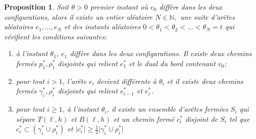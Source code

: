 \documentclass[titlepage,a4paper,12pt]{article}
\newcounter{prop}
\newtheorem{chaine}[prop]{Proposition}
\begin{document}
\begin{chaine}
\label{chaine}
Soit $\theta>0$ premier instant où $e_0$ diffère dans les deux configurations, alors il existe un entier aléatoire $N\in \mathbb{N},$ une suite d'arêtes aléatoires $e_1,\dots,e_N$ et des instants aléatoires $0<\theta_1< \theta_2<\dots<\theta_N=t$ qui vérifient les conditions suivantes:

\begin{enumerate}[leftmargin =*]
\item à l'instant $\theta_1$, $e_1$ diffère dans les deux configurations. Il existe deux chemins fermés $p_1^*,\rho_1^*$ disjoints qui relient $e_1^*$ et le dual du bord contenant $v_0$;

\item pour tout $i>1$, l'arête $e_i$ devient différente à $\theta_i$ et il existe deux chemins fermés $\gamma_i^*,\rho_i^*$ disjoints qui relient $e_{i-1}^*$ et $e_i^*$.

\item pour tout $i\geqslant 1$, à l'instant $\theta_i$, il existe un ensemble d'arêtes fermées $S_i$ qui sépare $T(\ell,h)$ et $B(\ell,h)$ et un chemin fermé $c^*_i$ disjoint de $S_i$ tel que $c_i^* \subset (\gamma_i^*\cup \rho_i^*)$ et $\vert c_i^*\vert \geqslant \frac{1}{2} \vert \gamma_i^*\cup \rho_i^* \vert$
\end{enumerate}

\end{chaine}
\end{document}

